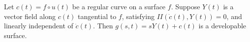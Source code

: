 \begin{proposition}[3.7.7]
Let $c(t) = f \circ u(t)$ be a regular curve on a surface $f$. Suppose $Y(t)$ is a vector field along $c(t)$ tangential to $f$, satisfying $II(\dot{c}(t), Y(t)) = 0$, and linearly independent of $\dot{c}(t)$. Then $g(s, t) = s Y(t) + c(t)$ is a developable surface.
\end{proposition}
